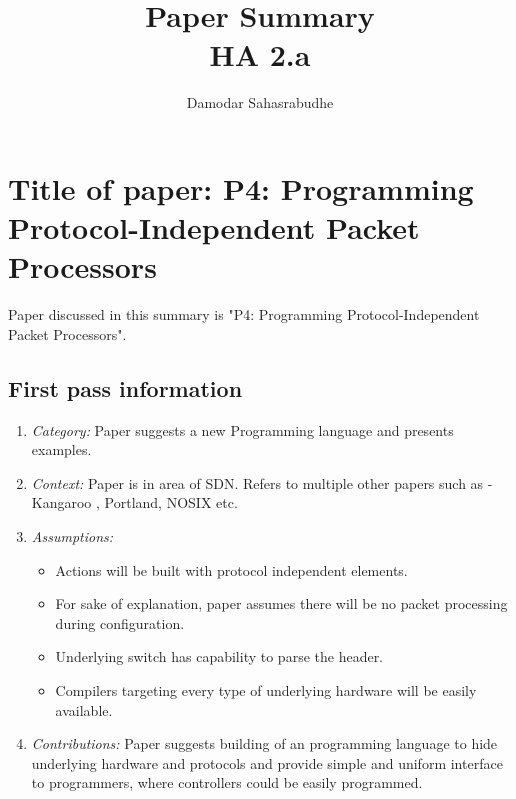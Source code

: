 \documentclass[letterpaper,twocolumn,10pt]{article}
\title{Paper Summary\\
HA 2.a\\}
\author{Damodar Sahasrabudhe}
\affil{School of Computing, University of Utah}
\begin{document}
\maketitle
\section{Title of paper: P4: Programming Protocol-Independent Packet Processors}
Paper discussed in this summary is "P4: Programming Protocol-Independent Packet Processors"\cite{paper}.

\subsection{First pass information}
\label{sec:first}

\begin{enumerate}

\item {\it Category:} Paper suggests a new Programming language and presents examples.

\item {\it Context:} Paper is in area of SDN. Refers to multiple other papers such as - Kangaroo \cite{Kangaroo}, Portland\cite{Kangaroo}, NOSIX\cite{Kangaroo} etc.

\item {\it Assumptions:}  
\begin{itemize}
\item Actions will be built with protocol independent elements.
\item For sake of explanation, paper assumes there will be no packet processing during configuration.
\item Underlying switch has capability to parse the header.
\item Compilers targeting every type of underlying hardware will be easily available.

\end{itemize}

\item {\it Contributions:} Paper suggests building of an programming language to hide underlying hardware and protocols and provide simple and uniform interface to programmers, where controllers could be easily programmed.


\end{enumerate}
\end{document}
